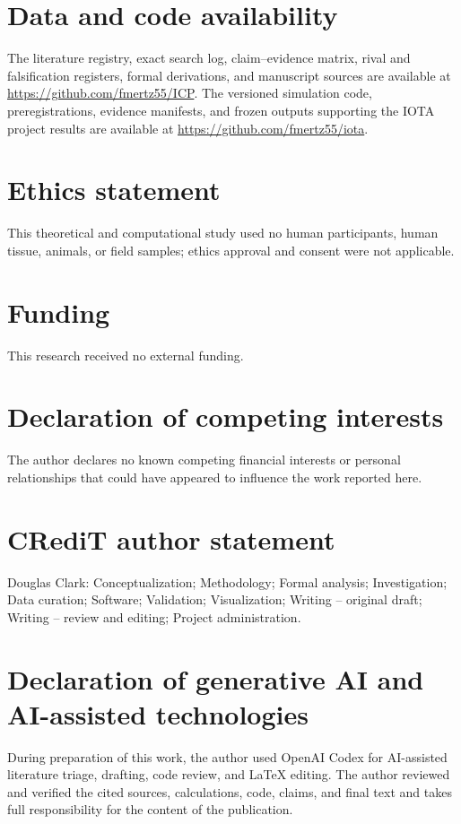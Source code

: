 \documentclass[11pt]{article}
\begin{document}
\section*{Data and code availability}
The literature registry, exact search log, claim--evidence matrix, rival and
falsification registers, formal derivations, and manuscript sources are
available at \url{https://github.com/fmertz55/ICP}. The versioned simulation
code, preregistrations, evidence manifests, and frozen outputs supporting the
IOTA project results are available at
\url{https://github.com/fmertz55/iota}.

\section*{Ethics statement}
This theoretical and computational study used no human participants, human
tissue, animals, or field samples; ethics approval and consent were not
applicable.

\section*{Funding}
This research received no external funding.

\section*{Declaration of competing interests}
The author declares no known competing financial interests or personal
relationships that could have appeared to influence the work reported here.

\section*{CRediT author statement}
Douglas Clark: Conceptualization; Methodology; Formal analysis; Investigation;
Data curation; Software; Validation; Visualization; Writing -- original draft;
Writing -- review and editing; Project administration.

\section*{Declaration of generative AI and AI-assisted technologies}
During preparation of this work, the author used OpenAI Codex for
AI-assisted literature triage, drafting, code review, and LaTeX editing. The
author reviewed and verified the cited sources, calculations, code, claims, and
final text and takes full responsibility for the content of the publication.



\end{document}

